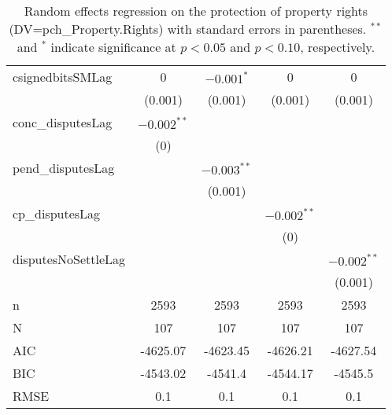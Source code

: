 \begin{table}[ht]
\begin{tabular}{lcccc}
  csignedbitsSMLag & 0 & $-0.001^{\ast}$ & 0 & 0 \\ 
   & (0.001) & (0.001) & (0.001) & (0.001) \\ 
  conc\_disputesLag & $-0.002^{\ast\ast}$ &  &  &  \\ 
   & (0) &  &  &  \\ 
  pend\_disputesLag &  & $-0.003^{\ast\ast}$ &  &  \\ 
   &  & (0.001) &  &  \\ 
  cp\_disputesLag &  &  & $-0.002^{\ast\ast}$ &  \\ 
   &  &  & (0) &  \\ 
  disputesNoSettleLag &  &  &  & $-0.002^{\ast\ast}$ \\ 
   &  &  &  & (0.001) \\ 
   \hline
n & 2593 & 2593 & 2593 & 2593 \\ 
  N & 107 & 107 & 107 & 107 \\ 
  AIC & -4625.07 & -4623.45 & -4626.21 & -4627.54 \\ 
  BIC & -4543.02 & -4541.4 & -4544.17 & -4545.5 \\ 
  RMSE & 0.1 & 0.1 & 0.1 & 0.1 \\ 
   \hline
\hline
\end{tabular}
\caption{Random effects regression on the protection of property rights (DV=pch\_Property.Rights) with standard errors in parentheses. $^{**}$ and $^{*}$ indicate significance at $p< 0.05 $ and $p< 0.10 $, respectively.} 
\end{table}
